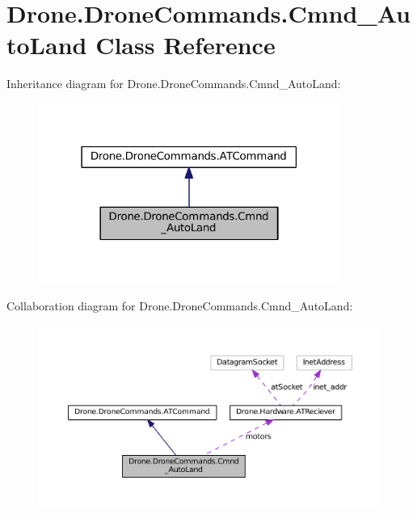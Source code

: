 \hypertarget{class_drone_1_1_drone_commands_1_1_cmnd___auto_land}{}\section{Drone.\+Drone\+Commands.\+Cmnd\+\_\+\+Auto\+Land Class Reference}
\label{class_drone_1_1_drone_commands_1_1_cmnd___auto_land}


Inheritance diagram for Drone.\+Drone\+Commands.\+Cmnd\+\_\+\+Auto\+Land\+:\nopagebreak
\begin{figure}[H]
\begin{center}
\leavevmode
\includegraphics[width=279pt]{class_drone_1_1_drone_commands_1_1_cmnd___auto_land__inherit__graph}
\end{center}
\end{figure}


Collaboration diagram for Drone.\+Drone\+Commands.\+Cmnd\+\_\+\+Auto\+Land\+:\nopagebreak
\begin{figure}[H]
\begin{center}
\leavevmode
\includegraphics[width=350pt]{class_drone_1_1_drone_commands_1_1_cmnd___auto_land__coll__graph}
\end{center}
\end{figure}
